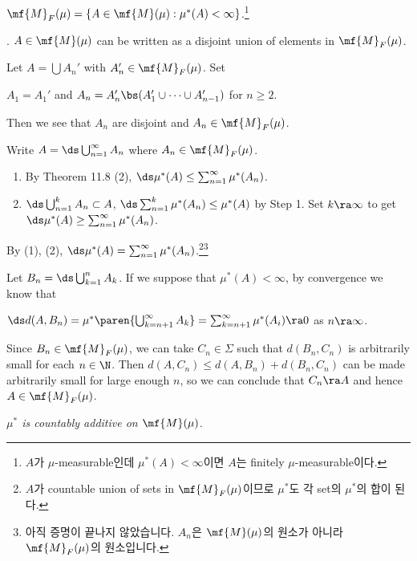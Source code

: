  \textit{\(\mf{M}_F(\mu) = \{A \in \mf{M}(\mu) : \mu^\ast(A) < \infty\}\).}\footnote{\(A\)가 \(\mu\)-measurable인데 \(\mu^\ast(A) < \infty\)이면 \(A\)는 finitely \(\mu\)-measurable이다.}

\quad \claim. \(A \in \mf{M}(\mu)\) can be written as a disjoint union of elements in \(\mf{M}_F(\mu)\).

\quad \pf Let \(A = \bigcup A_n'\) with \(A_n' \in \mf{M}_F(\mu)\). Set
\begin{center}
    \(A_1 = A_1'\) and \(A_n = A_n' \bs (A_1'\cup \cdots \cup A_{n-1}')\) for \(n \geq 2\).
\end{center}
Then we see that \(A_n\) are disjoint and \(A_n \in \mf{M}_F(\mu)\).

Write \(A = \ds \bigcup_{n=1}^\infty A_n\) where \(A_n \in \mf{M}_F(\mu)\).
\begin{enumerate}
    \item By {\sffamily Theorem 11.8} (2), \(\ds \mu^\ast(A) \leq \sum_{n=1}^{\infty} \mu^\ast (A_n)\).
    \item \(\ds \bigcup_{n=1}^k A_n \subset A\), \(\ds \sum_{n=1}^{k} \mu^\ast(A_n) \leq \mu^\ast(A)\) by {\sffamily Step 1}. Set \(k \ra \infty\) to get \(\ds \mu^\ast(A) \geq \sum_{n=1}^\infty \mu^\ast(A_n)\).
\end{enumerate}

By (1), (2), \(\ds \mu^\ast(A) = \sum_{n=1}^\infty \mu^\ast(A_n)\).\footnote{\(A\)가 countable union of sets in \(\mf{M}_F(\mu)\)이므로 \(\mu^\ast\)도 각 set의 \(\mu^\ast\)의 합이 된다.}\footnote{아직 증명이 끝나지 않았습니다. \(A_n\)은 \(\mf{M}(\mu)\)의 원소가 아니라 \(\mf{M}_F(\mu)\)의 원소입니다.}

Let \(B_n =\ds \bigcup_{k=1}^n A_k\). If we suppose that \(\mu^\ast(A) < \infty\), by convergence we know that
\begin{center}
    \(\ds d(A, B_n) = \mu^\ast\paren{\bigcup_{k=n+1}^\infty A_k} = \sum_{k=n+1}^{\infty} \mu^\ast(A_i) \ra 0\) as \(n \ra \infty\).
\end{center}

Since \(B_n \in \mf{M}_F(\mu)\), we can take \(C_n \in \Sigma\) such that \(d(B_n, C_n)\) is arbitrarily small for each \(n \in \N\). Then \(d(A, C_n) \leq d(A, B_n) + d(B_n, C_n)\) can be made arbitrarily small for large enough \(n\), so we can conclude that \(C_n \ra A\) and hence \(A \in \mf{M}_F(\mu)\).

 \textit{\(\mu^\ast\) is countably additive on \(\mf{M}(\mu)\).}

